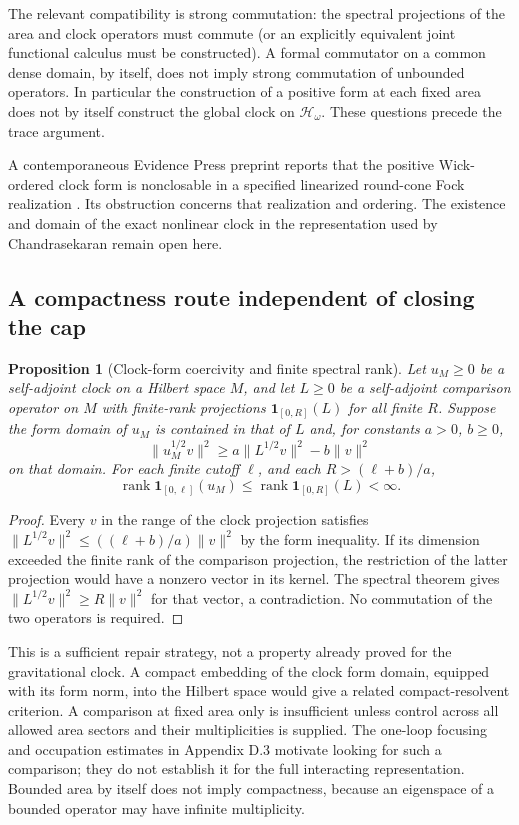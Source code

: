 \documentclass[11pt]{article}
\newcommand{\id}{\mathbf{1}}
\DeclareMathOperator{\rank}{rank}
\newtheorem{prop}{Proposition}
\begin{document}
The relevant compatibility is strong commutation: the spectral projections of the area and clock operators must commute (or an explicitly equivalent joint functional calculus must be constructed). A formal commutator on a common dense domain, by itself, does not imply strong commutation of unbounded operators. In particular the construction of a positive form at each fixed area does not by itself construct the global clock on $\mathcal H_\omega$. These questions precede the trace argument.

A contemporaneous Evidence Press preprint reports that the positive Wick-ordered clock form is nonclosable in a specified linearized round-cone Fock realization \cite{clock-uv}. Its obstruction concerns that realization and ordering. The existence and domain of the exact nonlinear clock in the representation used by Chandrasekaran remain open here.

\subsection{A compactness route independent of closing the cap}
\begin{prop}[Clock-form coercivity and finite spectral rank]\label{prop:compact-clock}
Let $u_M\ge0$ be a self-adjoint clock on a Hilbert space $M$, and let $L\ge0$ be a self-adjoint comparison operator on $M$ with finite-rank projections $\id_{[0,R]}(L)$ for all finite $R$. Suppose the form domain of $u_M$ is contained in that of $L$ and, for constants $a>0$, $b\ge0$,
\[
 \|u_M^{1/2}v\|^2\ge a\|L^{1/2}v\|^2-b\|v\|^2
\]
on that domain. For each finite cutoff $\ell$, and each $R>(\ell+b)/a$,
\[
 \rank\id_{[0,\ell]}(u_M)\le \rank\id_{[0,R]}(L)<\infty.
\]
\end{prop}
\begin{proof}
Every $v$ in the range of the clock projection satisfies $\|L^{1/2}v\|^2\le ((\ell+b)/a)\|v\|^2$ by the form inequality. If its dimension exceeded the finite rank of the comparison projection, the restriction of the latter projection would have a nonzero vector in its kernel. The spectral theorem gives $\|L^{1/2}v\|^2\ge R\|v\|^2$ for that vector, a contradiction. No commutation of the two operators is required.
\end{proof}
This is a sufficient repair strategy, not a property already proved for the gravitational clock. A compact embedding of the clock form domain, equipped with its form norm, into the Hilbert space would give a related compact-resolvent criterion. A comparison at fixed area only is insufficient unless control across all allowed area sectors and their multiplicities is supplied. The one-loop focusing and occupation estimates in Appendix D.3 motivate looking for such a comparison; they do not establish it for the full interacting representation. Bounded area by itself does not imply compactness, because an eigenspace of a bounded operator may have infinite multiplicity.
\end{document}
